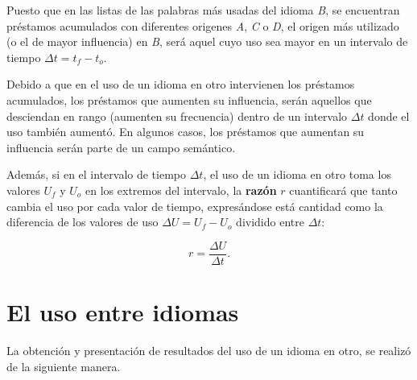 Puesto que en las listas de las palabras más usadas del idioma \textit{B}, se encuentran préstamos acumulados con diferentes origenes \textit{A}, \textit{C} o \textit{D}, el origen más utilizado (o el de mayor influencia) en \textit{B}, será aquel cuyo uso sea mayor en un intervalo de tiempo $\Delta t = t_{f} - t_{o}$.

Debido a que en el uso de un idioma en otro intervienen los préstamos acumulados, los préstamos que aumenten su influencia, serán aquellos que desciendan en rango (aumenten su frecuencia) dentro de un intervalo $\Delta t$ donde el uso también aumentó. En algunos casos, los préstamos  que aumentan su influencia serán parte de un campo semántico. 

Además, si en el intervalo de tiempo $\Delta t$, el uso de un idioma en otro toma los valores $U_{f}$ y $U_{o}$ en los extremos del intervalo, la \textbf{razón} $r$  cuantificará que tanto cambia el uso por cada valor de tiempo, expresándose está cantidad como la diferencia de los valores de uso $\Delta U = U_{f}-U_{o}$ dividido entre $\Delta t$:

\begin{equation}
r = \frac{\Delta U}{\Delta t}.
\label{ec.razon}
\end{equation}	




\section {El uso entre idiomas} 

La obtención y presentación de resultados del uso de un idioma en otro, se realizó de la siguiente manera.


